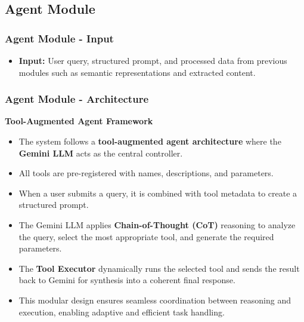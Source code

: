 \documentclass{beamer}
\begin{document}
\subsection{Agent Module}

\begin{frame}
\frametitle{Agent Module - Input}
\begin{itemize}
    \item \textbf{Input:} User query, structured prompt, and processed data from previous modules such as semantic representations and extracted content.
\end{itemize}
\end{frame}

\begin{frame}
\frametitle{Agent Module - Architecture}
\textbf{Tool-Augmented Agent Framework}
\begin{itemize}
    \item The system follows a \textbf{tool-augmented agent architecture} where the \textbf{Gemini LLM} acts as the central controller.
    \item All tools are pre-registered with names, descriptions, and parameters.
    \item When a user submits a query, it is combined with tool metadata to create a structured prompt.
    \item The Gemini LLM applies \textbf{Chain-of-Thought (CoT)} reasoning to analyze the query, select the most appropriate tool, and generate the required parameters.
    \item The \textbf{Tool Executor} dynamically runs the selected tool and sends the result back to Gemini for synthesis into a coherent final response.
    \item This modular design ensures seamless coordination between reasoning and execution, enabling adaptive and efficient task handling.
\end{itemize}
\end{frame}
\end{document}
